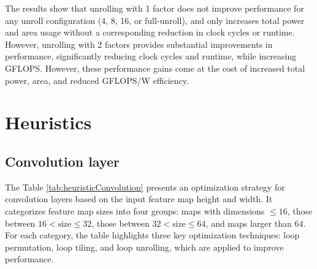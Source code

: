 The results show that unrolling with 1 factor does not improve performance for any unroll configuration (4, 8, 16, or full-unroll), and only increases total power and area usage without a corresponding reduction in clock cycles or runtime. However, unrolling with 2 factors provides substantial improvements in performance, significantly reducing clock cycles and runtime, while increasing GFLOPS. However, these performance gains come at the cost of increased total power, area, and reduced GFLOPS/W efficiency.

\clearpage
\section{Heuristics}

\subsection{Convolution layer}

\begin{table}[H]
\centering
\caption{Convolution layer heuristics}
\label{tab:heuristicConvolution}
\end{table}

The Table \ref{tab:heuristicConvolution} presents an optimization strategy for convolution layers based on the input feature map height and width. It categorizes feature map sizes into four groups: maps with dimensions \( \leq 16 \), those between \( 16 < \text{size} \leq 32 \), those between \( 32 < \text{size} \leq 64 \), and maps larger than \( 64 \). For each category, the table highlights three key optimization techniques: loop permutation, loop tiling, and loop unrolling, which are applied to improve performance.

